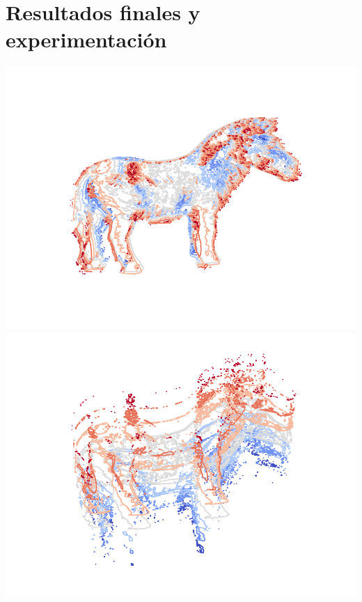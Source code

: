 \section{Resultados finales y experimentación}

{\centering
    \includegraphics[scale=0.6]{informe/imagenes/supnivel/supNivelCaballoLucesPropias578N1.pdf} \\
}
{\centering
    \includegraphics[scale=0.6]{informe/imagenes/supnivel/supNivelCaballoLucesPropias578N2.pdf} \\
}
